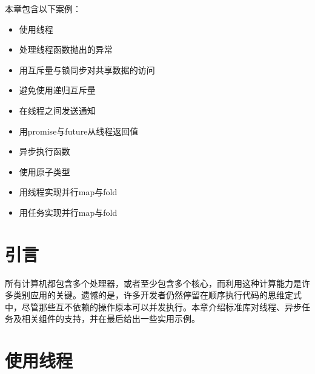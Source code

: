
本章包含以下案例：



\begin{itemize}
\item 使用线程



\item 处理线程函数抛出的异常



\item 用互斥量与锁同步对共享数据的访问



\item 避免使用递归互斥量



\item 在线程之间发送通知



\item 用promise与future从线程返回值



\item 异步执行函数



\item 使用原子类型



\item 用线程实现并行map与fold



\item 用任务实现并行map与fold


\end{itemize}



\section{引言}



所有计算机都包含多个处理器，或者至少包含多个核心，而利用这种计算能力是许多类别应用的关键。遗憾的是，许多开发者仍然停留在顺序执行代码的思维定式中，尽管那些互不依赖的操作原本可以并发执行。本章介绍标准库对线程、异步任务及相关组件的支持，并在最后给出一些实用示例。



\section{使用线程}


